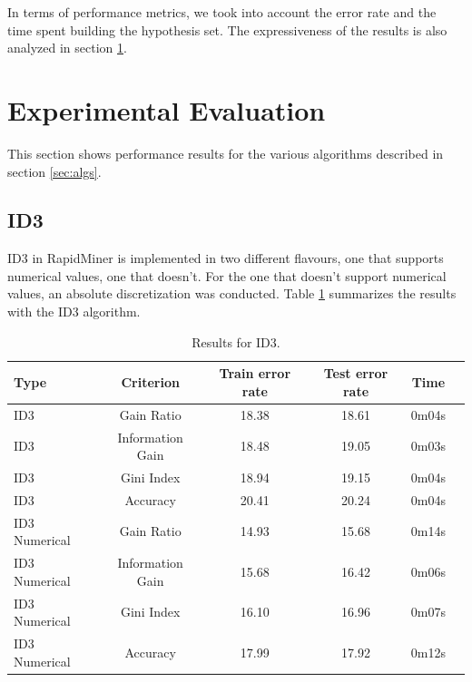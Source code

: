 \documentclass[a4paper]{llncs}
\begin{document}
In terms of performance metrics, we took into account the error rate and the 
time spent building the hypothesis set. The expressiveness of the results is
also analyzed in section \ref{sec:experimental_eval}.

\section{Experimental Evaluation} \label{sec:experimental_eval}

This section shows performance results for the various algorithms described in section \ref{sec:algs}.

\subsection{ID3}

ID3 in RapidMiner is implemented in two different flavours, one that supports
numerical values, one that doesn't. For the one that doesn't support numerical
values, an absolute discretization was conducted. Table \ref{tbl:results_id3}
summarizes the results with the ID3 algorithm.

\begin{table}
  \begin{center}
  \begin{tabular}{ | l | c | c | c | c | c |}
    \hline
    \textbf{Type} & \textbf{Criterion} & \textbf{Train error rate} & \textbf{Test error rate} & \textbf{Time} \\ \hline
    ID3 & Gain Ratio & 18.38 & 18.61 & 0m04s \\ \hline
    ID3 & Information Gain & 18.48 & 19.05 & 0m03s \\ \hline
    ID3 & Gini Index & 18.94 & 19.15 & 0m04s \\ \hline
    ID3 & Accuracy & 20.41 & 20.24 & 0m04s \\ \hline
    ID3 Numerical & Gain Ratio & 14.93 & 15.68 & 0m14s \\ \hline
    ID3 Numerical & Information Gain & 15.68 & 16.42 & 0m06s \\ \hline
    ID3 Numerical & Gini Index & 16.10 & 16.96 & 0m07s \\ \hline
    ID3 Numerical & Accuracy & 17.99 & 17.92 & 0m12s \\ \hline
  \end{tabular}
  \caption{Results for ID3.}
  \label{tbl:results_id3}
  \end{center}
\end{table}
\end{document}
